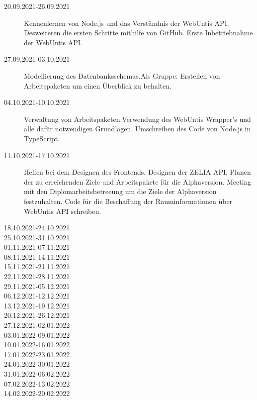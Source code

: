 
\begin{description}
    \item[20.09.2021-26.09.2021] Kennenlernen von Node.js und das Verständnis der WebUntis API. Desweiteren die ersten Schritte mithilfe von GitHub. Erste Inbetriebnahme der WebUntis API. 
    \item[27.09.2021-03.10.2021] Modellierung des Datenbanksschemas.Als Gruppe: Erstellen von Arbeitspaketen um einen Überblick zu behalten.
    \item[04.10.2021-10.10.2021] Verwaltung von Arbeitspaketen.Verwendung des WebUntis Wrapper's und alle dafür notwendigen Grundlagen. Umschreiben des Code von Node.js in TypeScript.
    \item[11.10.2021-17.10.2021] Helfen bei dem Designen des Frontends. Designen der ZELIA API. Planen der zu erreichenden Ziele und Arbeitspakete für die Alphaversion. Meeting mit den Diplomarbeitsbetreeung um die Ziele der Alphaversion festzuhalten. Code für die Beschaffung der Rauminformationen über WebUntis API schreiben. 
    \item[18.10.2021-24.10.2021]
    \item[25.10.2021-31.10.2021]
    \item[01.11.2021-07.11.2021]
    \item[08.11.2021-14.11.2021]
    \item[15.11.2021-21.11.2021]
    \item[22.11.2021-28.11.2021]
    \item[29.11.2021-05.12.2021]
    \item[06.12.2021-12.12.2021]
    \item[13.12.2021-19.12.2021]
    \item[20.12.2021-26.12.2021]
    \item[27.12.2021-02.01.2022]
    \item[03.01.2022-09.01.2022]
    \item[10.01.2022-16.01.2022]
    \item[17.01.2022-23.01.2022]
    \item[24.01.2022-30.01.2022]
    \item[31.01.2022-06.02.2022]
    \item[07.02.2022-13.02.2022]
    \item[14.02.2022-20.02.2022]
\end{description}